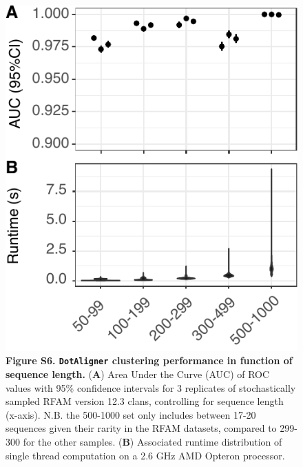 \documentclass{bmcart}
\newcommand\dotaligner{\texttt{DotAligner}}
\begin{document}
\begin{figure}
 \includegraphics{SF6}
  \caption* {{\textbf{Figure S6. \dotaligner{} clustering performance in function of sequence length.} }
 (\textbf{A})  Area Under the Curve (AUC) of ROC values with 95\% confidence intervals 
for 3 replicates of stochastically sampled RFAM version 12.3 clans, controlling for sequence length (x-axis). 
N.B. the 500-1000 set only includes between 17-20 sequences given their rarity in the RFAM datasets, 
compared to 299-300 for the other samples. 
 (\textbf{B}) Associated runtime distribution of single thread computation on a 2.6 GHz AMD Opteron processor. } 
\end{figure}

\end{document}
